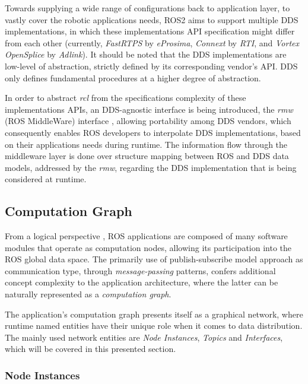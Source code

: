 Towards supplying a wide range of configurations back to application layer, to vastly cover the robotic applications needs, ROS2 aims to support multiple DDS implementations, in which these implementations API specification might differ from each other (currently, \textit{FastRTPS} by \textit{eProsima}, \textit{Connext} by \textit{RTI}, and \textit{Vortex OpenSplice} by \textit{Adlink}). It should be noted that the DDS implementations are low-level of abstraction, strictly defined by its corresponding vendor's API. DDS only defines fundamental procedures at a higher degree of abstraction.  

In order to abstract \textit{rcl} from the specifications complexity of these implementations APIs, an DDS-agnostic interface is being introduced, the \textit{rmw} (ROS MiddleWare) interface \cite{casini2019response}, allowing portability among DDS vendors, which consequently enables ROS developers to interpolate DDS implementations, based on their applications needs during runtime. The information flow through the middleware layer is done over structure mapping between ROS and DDS data models, addressed by the \textit{rmw}, regarding the DDS implementation that is being considered at runtime.

\subsection{Computation Graph}

From a logical perspective \cite{casini2019response}, ROS applications are composed of many software modules that operate as computation nodes, allowing its participation into the ROS global data space. The primarily use of publish-subscribe model approach as communication type, through \textit{message-passing} patterns, confers additional concept complexity to the application architecture, where the latter can be naturally represented as a \textit{computation graph}. \cite{cousins2010welcome}

The application's computation graph presents itself as a graphical network, where runtime named entities have their unique role when it comes to data distribution. The mainly used network entities are \textit{Node Instances}, \textit{Topics} and \textit{Interfaces}, which will be covered in this presented section.

\subsubsection{Node Instances}

